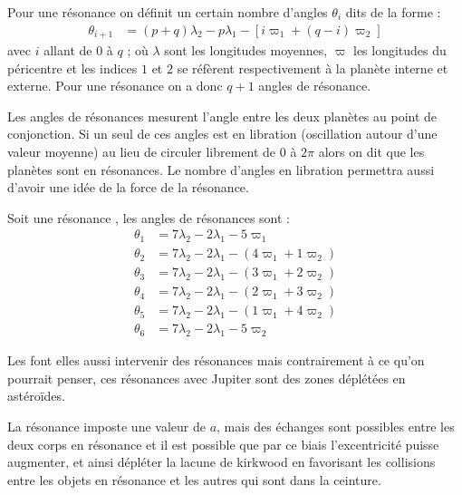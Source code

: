 Pour une résonance  on définit un certain nombre d'angles $\theta_i$ dits  de la forme :
\begin{align}
\theta_{i+1} &=(p+q)\lambda_2 -p\lambda_1 - \left[i\varpi_{1} + (q-i)\varpi_2\right]
\end{align}
avec $i$ allant de $0$ à $q$ ; où $\lambda$ sont les longitudes moyennes, $\varpi$ les longitudes du péricentre et les indices
$1$ et $2$ se réfèrent respectivement à la planète interne et externe. Pour une résonance  on a donc $q+1$ angles
de résonance.

Les angles de résonances mesurent l'angle entre les deux planètes au point de conjonction. Si un seul de ces angles est en
libration (oscillation autour d'une valeur moyenne) au lieu de circuler librement de $0$ à $2\pi$ alors on dit que les planètes
sont en résonances. Le nombre d'angles en libration permettra aussi d'avoir une idée de la force de la résonance.

\begin{exemple}
Soit une résonance , les angles de résonances sont :
\begin{align*}
\theta_1 &= 7 \lambda_2 -2\lambda_1 - 5 \varpi_1\\
\theta_2 &= 7 \lambda_2 -2\lambda_1 - \left( 4 \varpi_1 + 1\varpi_2 \right)\\
\theta_3 &= 7 \lambda_2 -2\lambda_1 - \left( 3 \varpi_1 + 2\varpi_2 \right)\\
\theta_4 &= 7 \lambda_2 -2\lambda_1 - \left( 2 \varpi_1 + 3\varpi_2 \right)\\
\theta_5 &= 7 \lambda_2 -2\lambda_1 - \left( 1 \varpi_1 + 4\varpi_2 \right)\\
\theta_6 &= 7 \lambda_2 -2\lambda_1 - 5 \varpi_2
\end{align*}
\end{exemple}

\begin{remarque}
Les  font elles aussi intervenir des résonances mais contrairement à ce
qu'on pourrait penser, ces résonances avec Jupiter sont des zones déplétées en astéroïdes. 

La résonance imposte une valeur de $a$, mais des échanges sont possibles entre les deux corps en résonance et il est possible
que par ce biais l'excentricité puisse augmenter, et ainsi dépléter la lacune de kirkwood en favorisant les collisions entre les
objets en résonance et les autres qui sont dans la ceinture.
\end{remarque}


